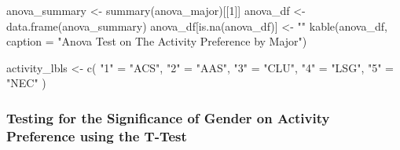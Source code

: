 \documentclass[
  letterpaper,
  DIV=11,
  numbers=noendperiod]{scrartcl}
\newenvironment{Shaded}{\begin{snugshade}}{\end{snugshade}}
\newcommand{\AttributeTok}[1]{\textcolor[rgb]{0.40,0.45,0.13}{#1}}
\newcommand{\DecValTok}[1]{\textcolor[rgb]{0.68,0.00,0.00}{#1}}
\newcommand{\FunctionTok}[1]{\textcolor[rgb]{0.28,0.35,0.67}{#1}}
\newcommand{\NormalTok}[1]{\textcolor[rgb]{0.00,0.23,0.31}{#1}}
\newcommand{\OtherTok}[1]{\textcolor[rgb]{0.00,0.23,0.31}{#1}}
\newcommand{\StringTok}[1]{\textcolor[rgb]{0.13,0.47,0.30}{#1}}
\begin{document}
\begin{Shaded}
\begin{Highlighting}[]
\NormalTok{anova\_summary }\OtherTok{\textless{}{-}} \FunctionTok{summary}\NormalTok{(anova\_major)[[}\DecValTok{1}\NormalTok{]]}
\NormalTok{anova\_df }\OtherTok{\textless{}{-}} \FunctionTok{data.frame}\NormalTok{(anova\_summary)}
\NormalTok{anova\_df[}\FunctionTok{is.na}\NormalTok{(anova\_df)] }\OtherTok{\textless{}{-}} \StringTok{""}
\FunctionTok{kable}\NormalTok{(anova\_df, }\AttributeTok{caption =} \StringTok{"Anova Test on The Activity Preference by Major"}\NormalTok{)}
\end{Highlighting}
\end{Shaded}

\begin{Shaded}
\begin{Highlighting}[]
\NormalTok{activity\_lbls }\OtherTok{\textless{}{-}} \FunctionTok{c}\NormalTok{(}
  \StringTok{"1"} \OtherTok{=} \StringTok{"ACS"}\NormalTok{,  }
  \StringTok{"2"} \OtherTok{=} \StringTok{"AAS"}\NormalTok{,}
  \StringTok{"3"} \OtherTok{=} \StringTok{"CLU"}\NormalTok{,}
  \StringTok{"4"} \OtherTok{=} \StringTok{"LSG"}\NormalTok{,  }
  \StringTok{"5"} \OtherTok{=} \StringTok{"NEC"}   
\NormalTok{)}
\end{Highlighting}
\end{Shaded}

\subsubsection{Testing for the Significance of Gender on Activity
Preference using the
T-Test}\label{testing-for-the-significance-of-gender-on-activity-preference-using-the-t-test}
\end{document}

